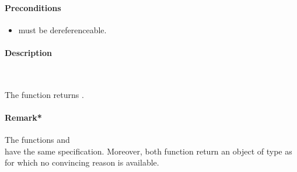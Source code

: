 \paragraph{Preconditions}
\begin{itemize}
    \item  {} must be dereferenceable.
\end{itemize}

\paragraph{Description}~

The function  returns .

\paragraph{Remark*}
The functions \peekfinish and\\
\pokefinish have the same specification.
Moreover, both function return an object of type  as 
for which no convincing reason is available.





